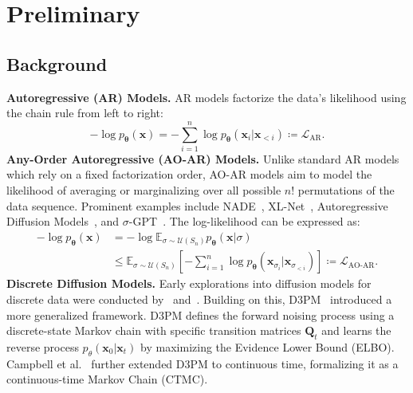 
\section{Preliminary}
\subsection{Background}
\textbf{Autoregressive (AR) Models.} AR models factorize the data's likelihood using the chain rule from left to right:
\begin{equation}\label{eq:ar loss}
    -\log p_{\boldsymbol{\theta}}\left(\boldsymbol{x}\right) =  - \sum_{i=1}^n \log p_{\boldsymbol{\theta}}\left(\boldsymbol{x}_i | \boldsymbol{x}_{<i}\right) \coloneqq \mathcal{L}_{\text{AR}}.
\end{equation}
\textbf{Any-Order Autoregressive (AO-AR) Models.}
Unlike standard AR models which rely on a fixed factorization order, AO-AR models aim to model the likelihood of averaging or marginalizing over all possible $n!$ permutations of the data sequence. Prominent examples include NADE~\cite{uria2016neural}, XL-Net~\cite{yang2019xlnet}, Autoregressive Diffusion Models~\cite{hoogeboom2021autoregressive}, and $\sigma$-GPT~\cite{pannatier2024sigma}. The log-likelihood can be expressed as:
\begin{equation}\label{eq:ao-ar loss}
\begin{aligned}
-\log p_{\boldsymbol{\theta}}\left(\boldsymbol{x}\right) &= -\log \mathbb{E}_{\sigma\sim \mathcal{U}(S_n)} p_{\boldsymbol{\theta}}\left(\boldsymbol{x}|\sigma\right)\\
&\leq \mathbb{E}_{\sigma\sim \mathcal{U}(S_n)} \left[ -\sum_{i=1}^n \log p_{\boldsymbol{\theta}}\left(\boldsymbol{x}_{\sigma_i}| \boldsymbol{x}_{\sigma_{<i}}\right)\right] \coloneqq \mathcal{L}_{\text{AO-AR}}.
\end{aligned}
\end{equation}
\textbf{Discrete Diffusion Models.}
Early explorations into diffusion models for discrete data were conducted by~\cite{sohl2015deep} and~\cite{hoogeboom2021argmax}.
Building on this, D3PM~\cite{austin2021structured} introduced a more generalized framework. D3PM defines the forward noising process using a discrete-state Markov chain with specific transition matrices $\boldsymbol{Q}_t$ and learns the reverse process $p_{\theta}(\boldsymbol{x}_0 | \boldsymbol{x}_t)$ by maximizing the Evidence Lower Bound (ELBO).
Campbell et al.~\cite{campbell2022continuous} further extended D3PM to continuous time, formalizing it as a continuous-time Markov Chain (CTMC).
